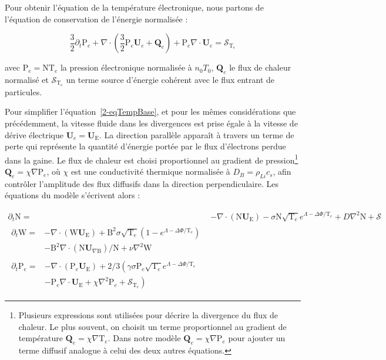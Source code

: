 \begin{refsection}
	Pour obtenir l'équation de la température électronique, nous partons de
	l'équation de conservation de l'énergie normalisée :
	
	\begin{equation} 
	\label{2-eqTempBase}
		\frac{3}{2}\partial_t \text{P}_e +
		\nabla\cdot\left(\frac{3}{2}\text{P}_e\mathbf{U}_e+\mathbf{Q}_e\right) +
		\text{P}_e\nabla\cdot\mathbf{U}_e=\mathcal{S}_{\text{T}_e} 
	\end{equation}
	
	avec $\text{P}_e=\text{NT}_e$ la pression électronique normalisée à $n_0T_0$,
	$\mathbf{Q}_e$ le flux de chaleur normalisé et $\mathcal{S}_{\text{T}_e}$ un
	terme source d'énergie cohérent avec le flux entrant de particules. 
	
	Pour simplifier l'équation~\ref{2-eqTempBase}, et pour les mêmes
	considérations que précédemment, la vitesse fluide dans les divergences est
	prise égale à la vitesse de dérive électrique $\mathbf U_e=\mathbf
	U_\text{E}$. La direction parallèle apparaît à travers un terme de
	perte qui représente la quantité d'énergie portée par le flux d'électrons
	perdue dans la gaine.
	Le flux de chaleur est choisi proportionnel au gradient de pression\footnote{Plusieurs expressions
	sont utilisées pour décrire la divergence du flux de chaleur. Le plus souvent,
	on choisit un terme proportionnel au gradient de température 
$\mathbf{Q}_e=\chi\nabla\text{T}_e$. Dans
notre modèle $\mathbf{Q}_e=\chi\nabla\text{P}_e$ pour ajouter un terme diffusif
analogue à celui des deux autres équations.}
$\mathbf{Q}_e=\chi\nabla\text{P}_e$, où $\chi$ est une conductivité thermique
normalisée à $D_B=\rho_{Li}c_s$, afin contrôler l'amplitude des flux diffusifs
dans la direction perpendiculaire.
	Les équations du modèle s'écrivent alors :
	
\begin{align}
\label{2-eqContinuiteTemp}
\partial_t \text{N}
=& - \nabla\cdot\left(\text{N}\mathbf U_\text{E}\right) -\sigma
\text{N}\sqrt{\text{T}_e}e^{\Lambda-\Delta\Phi/\text{T}_e} + D\nabla^2 \text{N}
+ \mathcal{S}
\\[0.5cm]
\label{2-eqCourantTemp}
\begin{split}
\partial_{t}\text{W} =& 
-\nabla\cdot\left(\text{W}\mathbf U_\text{E}\right)
+\text{B}^2\sigma\sqrt{\text{T}_e}\left(1-e^{\Lambda-\Delta\Phi/\text{T}_e}\right)\\
&-\text{B}^2\nabla\cdot\left(\text{N}\mathbf
U_{\nabla\text{B}}\right)/\text{N} +\nu\nabla^2\text{W}
\end{split}
\\[0.5cm]
\label{2-eqEnergyTemp}
\begin{split}
\partial_{t}\text{P}_e=&
-\nabla\cdot\left(\text{P}_e\mathbf U_\text{E}\right)
+2/3\left(\gamma\sigma\text{P}_e\sqrt{\text{T}_e}e^{\Lambda-\Delta\Phi/\text{T}_e}\right.\\
&\left.-\text{P}_e\nabla\cdot\mathbf U_\text{E}
+\chi\nabla^2\text{P}_e
+\mathcal{S}_{\text{T}_e}\right)
\end{split}
\end{align}


\end{refsection}
